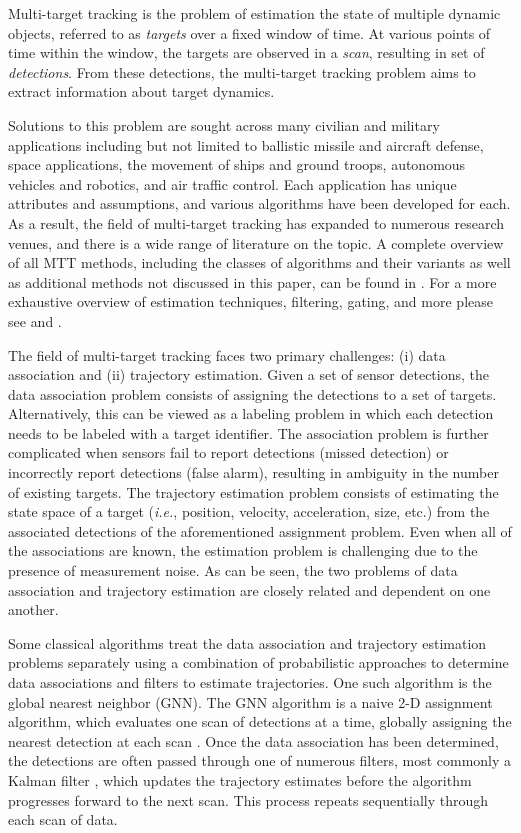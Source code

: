 Multi-target tracking is the problem of estimation the state of multiple dynamic objects, referred to as \textit{targets} over a fixed window of time. At various points of time within the window, the targets are observed in a \textit{scan}, resulting in set of \textit{detections}. From these detections, the multi-target tracking problem aims to extract information about target dynamics. 

Solutions to this problem are sought across many civilian and military applications including but not limited to ballistic missile and aircraft defense, space applications, the movement of ships and ground troops, autonomous vehicles and robotics, and air traffic control. Each application has unique attributes and assumptions, and various algorithms have been developed for each. As a result, the field of multi-target tracking has expanded to numerous research venues, and there is a wide range of literature on the topic. A complete overview of all MTT methods, including the classes of algorithms and their variants as well as additional methods not discussed in this paper, can be found in \cite{MTT-Taxonomy}. For a more exhaustive overview of estimation techniques, filtering, gating, and more please see \cite{Bar-Shalom_MTT} and \cite{Bar-Shalom_Estimation}.

The field of multi-target tracking faces two primary challenges: (i) data association and (ii) trajectory estimation.  Given a set of sensor detections, the data association problem consists of assigning the detections to a set of targets. Alternatively, this can be viewed as a labeling problem in which each detection needs to be labeled with a target identifier. The association problem is further complicated when sensors fail to report detections (missed detection) or incorrectly report detections (false alarm), resulting in ambiguity in the number of existing targets. The trajectory estimation problem consists of estimating the state space of a target (\textit{i.e.}, position, velocity, acceleration, size, etc.) from the associated detections of the aforementioned assignment problem. Even when all of the associations are known, the estimation problem is challenging due to the presence of measurement noise. As can be seen, the two problems of data association and trajectory estimation are closely related and dependent on one another. 

Some classical algorithms treat the data association and trajectory estimation problems separately using a combination of probabilistic approaches to determine data associations and filters to estimate trajectories. One such algorithm is the global nearest neighbor (GNN). The GNN algorithm is a naive 2-D assignment algorithm, which evaluates one scan of detections at a time, globally assigning the nearest detection at each scan \cite{GNN}. Once the data association has been determined, the detections are often passed through one of numerous filters, most commonly a Kalman filter \cite{Kalman}, which updates the trajectory estimates before the algorithm progresses forward to the next scan. This process repeats sequentially through each scan of data.

